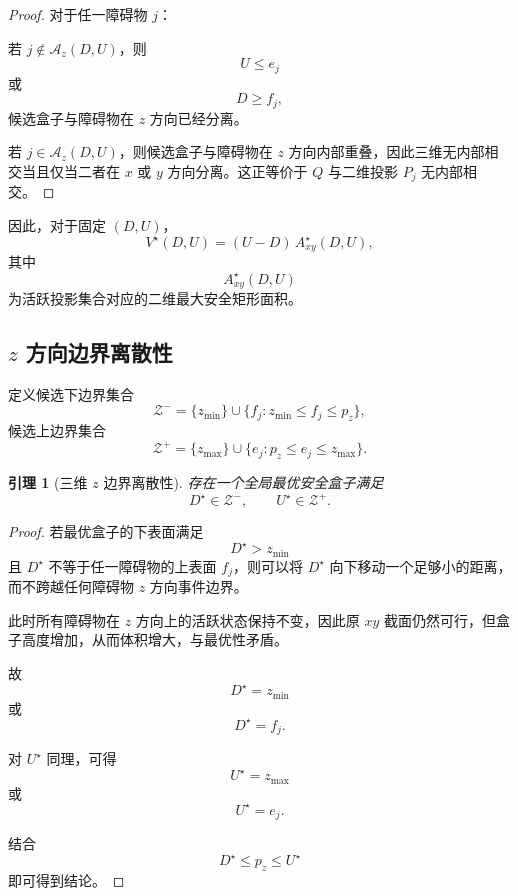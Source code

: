 \documentclass[UTF8,12pt,a4paper]{ctexart}
\newtheorem{lemma}{引理}
\begin{document}
\begin{proof}
对于任一障碍物 $j$：

若 $j\notin\mathcal A_z(D,U)$，则
\[
U\le e_j
\]
或
\[
D\ge f_j,
\]
候选盒子与障碍物在 $z$ 方向已经分离。

若 $j\in\mathcal A_z(D,U)$，则候选盒子与障碍物在 $z$ 方向内部重叠，因此三维无内部相交当且仅当二者在 $x$ 或 $y$ 方向分离。这正等价于 $Q$ 与二维投影 $P_j$ 无内部相交。
\end{proof}

因此，对于固定 $(D,U)$，
\begin{equation}
\boxed{
V^\star(D,U)
=
(U-D)\,
A^\star_{xy}(D,U),
}
\end{equation}
其中
\[
A^\star_{xy}(D,U)
\]
为活跃投影集合对应的二维最大安全矩形面积。

\subsection{\texorpdfstring{$z$}{z} 方向边界离散性}

定义候选下边界集合
\begin{equation}
\boxed{
\mathcal Z^-
=
\{z_{\min}\}
\cup
\{f_j:
z_{\min}\le f_j\le p_z\},
}
\end{equation}
候选上边界集合
\begin{equation}
\boxed{
\mathcal Z^+
=
\{z_{\max}\}
\cup
\{e_j:
p_z\le e_j\le z_{\max}\}.
}
\end{equation}

\begin{lemma}[三维 $z$ 边界离散性]
存在一个全局最优安全盒子满足
\begin{equation}
    D^\star\in\mathcal Z^-,
    \qquad
    U^\star\in\mathcal Z^+.
\end{equation}
\end{lemma}

\begin{proof}
若最优盒子的下表面满足
\[
D^\star>z_{\min}
\]
且 $D^\star$ 不等于任一障碍物的上表面 $f_j$，则可以将 $D^\star$ 向下移动一个足够小的距离，而不跨越任何障碍物 $z$ 方向事件边界。

此时所有障碍物在 $z$ 方向上的活跃状态保持不变，因此原 $xy$ 截面仍然可行，但盒子高度增加，从而体积增大，与最优性矛盾。

故
\[
D^\star=z_{\min}
\]
或
\[
D^\star=f_j.
\]

对 $U^\star$ 同理，可得
\[
U^\star=z_{\max}
\]
或
\[
U^\star=e_j.
\]

结合
\[
D^\star\le p_z\le U^\star
\]
即可得到结论。
\end{proof}
\end{document}
